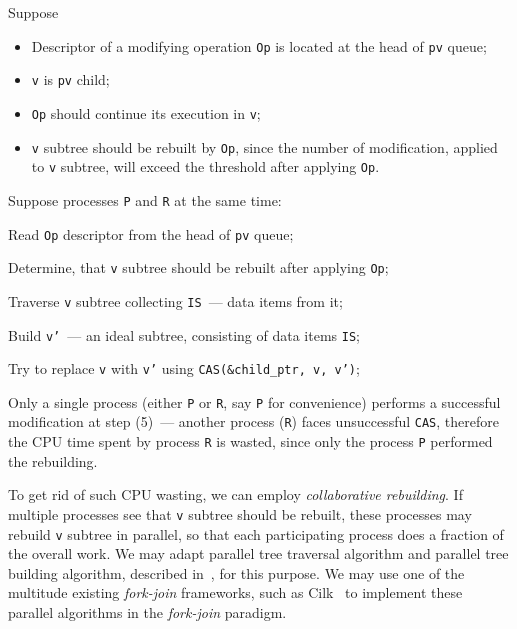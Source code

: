 \documentclass[times, dvipsnames,%
               languages={russian,english} %
              ]{itmo-student-thesis}
\begin{document}
Suppose 

\begin{itemize}
    \item Descriptor of a modifying operation \texttt{Op} is located at the head of \texttt{pv} queue;
    
    \item \texttt{v} is \texttt{pv} child;
    
    \item \texttt{Op} should continue its execution in \texttt{v};
    
    \item \texttt{v} subtree should be rebuilt by \texttt{Op}, since the number of modification, applied to \texttt{v} subtree, will exceed the threshold after applying \texttt{Op}.
\end{itemize}

\bigbreak

Suppose processes \texttt{P} and \texttt{R} at the same time:

\begin{nenum}
    \item Read \texttt{Op} descriptor from the head of \texttt{pv} queue;
    
    \item Determine, that \texttt{v} subtree should be rebuilt after applying \texttt{Op};
    
    \item Traverse \texttt{v} subtree collecting \texttt{IS}~--- data items from it;
    
    \item Build \texttt{v'}~--- an ideal subtree, consisting of data items \texttt{IS};
    
    \item Try to replace \texttt{v} with \texttt{v'} using \texttt{CAS(\&child\_ptr, v, v')};
\end{nenum}

\bigbreak

Only a single process (either \texttt{P} or \texttt{R}, say \texttt{P} for convenience) performs a successful modification at step (5)~--- another process (\texttt{R}) faces unsuccessful \texttt{CAS}, therefore the CPU time spent by process \texttt{R} is wasted, since only the process \texttt{P} performed the rebuilding.

To get rid of such CPU wasting, we can employ \emph{collaborative rebuilding}. If multiple processes see that \texttt{v} subtree should be rebuilt, these processes may rebuild \texttt{v} subtree in parallel, so that each participating process does a fraction of the overall work. We may adapt parallel tree traversal algorithm and parallel tree building algorithm, described in~\cite{jeje1992introduction}, for this purpose. We may use one of the multitude existing \emph{fork-join} frameworks, such as Cilk~\cite{blumofe1996cilk} to implement these parallel algorithms in the \emph{fork-join} paradigm.
\end{document}
